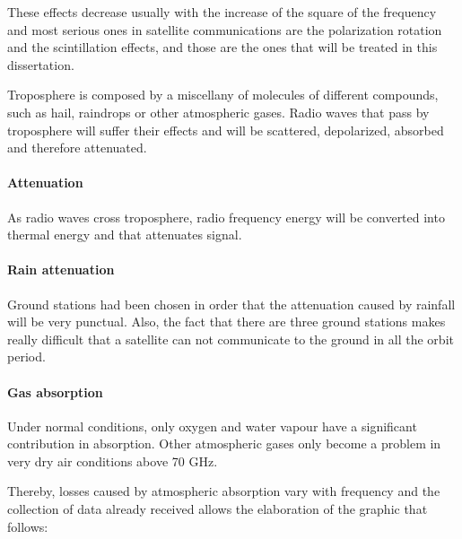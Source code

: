 These effects decrease usually with the increase of the square of the frequency and most serious ones in satellite communications are the polarization rotation and the
scintillation effects, and those are the ones that will be treated in this dissertation. \cite{Jorge2012}

Troposphere is composed by a miscellany of molecules of different compounds, such as hail, raindrops or other atmospheric gases. Radio waves that pass by troposphere will suffer their effects and will be scattered, depolarized, absorbed and therefore attenuated.

\paragraph{Attenuation} As radio waves cross troposphere, radio frequency energy will be converted into thermal energy and that attenuates signal.
\paragraph{Rain attenuation} Ground stations had been chosen in order that the attenuation caused by rainfall will be very punctual. Also, the fact that there are three ground stations makes really difficult that a satellite can not communicate to the ground in all the orbit period.\\
\paragraph{Gas absorption} Under normal conditions, only oxygen and water vapour have a significant contribution in absorption. Other atmospheric gases only become a problem in very dry air
conditions above 70 GHz.

Thereby, losses caused by atmospheric absorption vary with frequency and the collection of data already received allows the elaboration of the graphic that follows:

